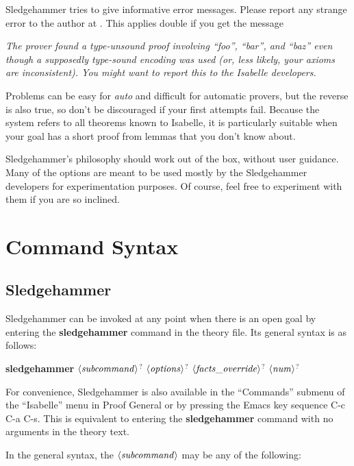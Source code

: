 \documentclass[a4paper,12pt]{article}
\def\qty#1{\ensuremath{\left<\mathit{#1\/}\right>}}
\begin{document}
Sledgehammer tries to give informative error messages. Please report any strange
error to the author at \authoremail. This applies double if you get the message

\prew
\slshape
The prover found a type-unsound proof involving ``\textit{foo\/}'',
``\textit{bar\/}'', and ``\textit{baz\/}'' even though a supposedly type-sound
encoding was used (or, less likely, your axioms are inconsistent). You might
want to report this to the Isabelle developers.
\postw


Problems can be easy for \textit{auto} and difficult for automatic provers, but
the reverse is also true, so don't be discouraged if your first attempts fail.
Because the system refers to all theorems known to Isabelle, it is particularly
suitable when your goal has a short proof from lemmas that you don't know about.


Sledgehammer's philosophy should work out of the box, without user guidance.
Many of the options are meant to be used mostly by the Sledgehammer developers
for experimentation purposes. Of course, feel free to experiment with them if
you are so inclined.

\section{Command Syntax}
\label{command-syntax}

\subsection{Sledgehammer}

Sledgehammer can be invoked at any point when there is an open goal by entering
the \textbf{sledgehammer} command in the theory file. Its general syntax is as
follows:

\prew
\textbf{sledgehammer} \qty{subcommand}$^?$ \qty{options}$^?$ \qty{facts\_override}$^?$ \qty{num}$^?$
\postw

For convenience, Sledgehammer is also available in the ``Commands'' submenu of
the ``Isabelle'' menu in Proof General or by pressing the Emacs key sequence C-c
C-a C-s. This is equivalent to entering the \textbf{sledgehammer} command with
no arguments in the theory text.

In the general syntax, the \qty{subcommand} may be any of the following:
\end{document}

